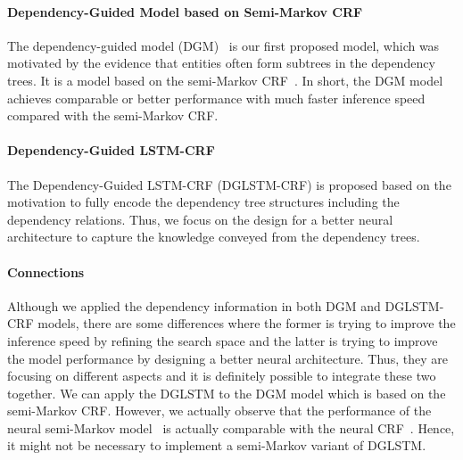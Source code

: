 \paragraph{Dependency-Guided Model based on Semi-Markov CRF}
The dependency-guided model (DGM)~\cite{jie2017efficient} is our first proposed model, which was motivated by the evidence that entities often form subtrees in the dependency trees.
It is a model based on the semi-Markov CRF~\cite{sarawagi2004semi}. 
In short, the DGM model achieves comparable or better performance with much faster inference speed compared with the semi-Markov CRF.

\paragraph{Dependency-Guided LSTM-CRF}
The Dependency-Guided LSTM-CRF (DGLSTM-CRF) is proposed based on the motivation to fully encode the dependency tree structures including the dependency relations. Thus, we focus on the design for a better neural architecture to capture the knowledge conveyed from the dependency trees. 


\paragraph{Connections}
Although we applied the dependency information in both DGM and DGLSTM-CRF models, there are some differences where the former is trying to improve the inference speed by refining the search space and the latter is trying to improve the model performance by designing a better neural architecture. 
Thus, they are focusing on different aspects and it is definitely possible to integrate these two together.
We can apply the DGLSTM to the DGM model which is based on the semi-Markov CRF. 
However, we actually observe that the performance of the neural semi-Markov model~\cite{ye2018hybrid} is actually comparable with the neural CRF~\cite{lample2016neural}. 
Hence, it might not be necessary to implement a semi-Markov variant of DGLSTM. 
